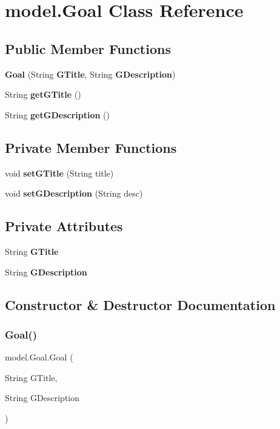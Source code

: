 \section{model.\+Goal Class Reference}
\label{classmodel_1_1_goal}
\subsection*{Public Member Functions}
\begin{DoxyCompactItemize}
\item 
\textbf{ Goal} (String \textbf{ G\+Title}, String \textbf{ G\+Description})
\item 
String \textbf{ get\+G\+Title} ()
\item 
String \textbf{ get\+G\+Description} ()
\end{DoxyCompactItemize}
\subsection*{Private Member Functions}
\begin{DoxyCompactItemize}
\item 
void \textbf{ set\+G\+Title} (String title)
\item 
void \textbf{ set\+G\+Description} (String desc)
\end{DoxyCompactItemize}
\subsection*{Private Attributes}
\begin{DoxyCompactItemize}
\item 
String \textbf{ G\+Title}
\item 
String \textbf{ G\+Description}
\end{DoxyCompactItemize}


\subsection{Constructor \& Destructor Documentation}
\mbox{\label{classmodel_1_1_goal_a644155c1120c9aea01bb7c2a308fa403}} 
\subsubsection{Goal()}
{\footnotesize\ttfamily model.\+Goal.\+Goal (\begin{DoxyParamCaption}\item[{String}]{G\+Title,  }\item[{String}]{G\+Description }\end{DoxyParamCaption})}

